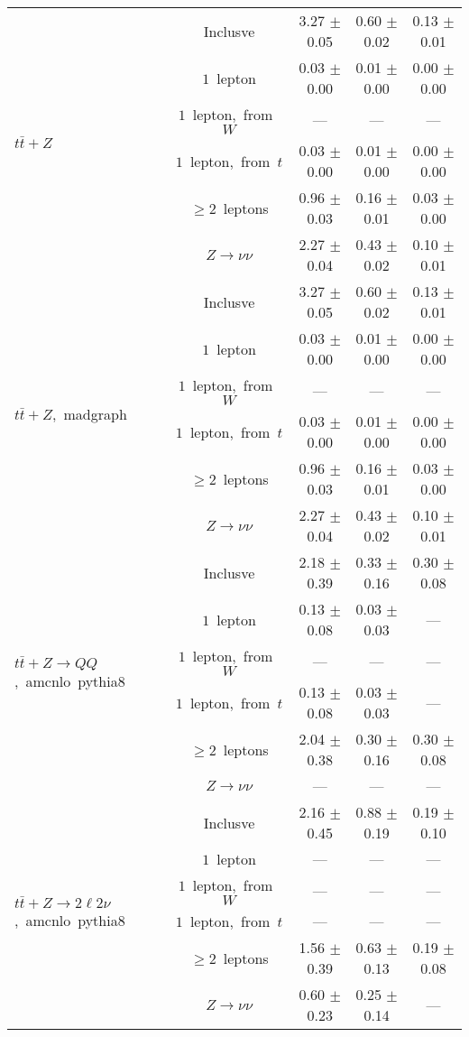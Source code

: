 \documentclass{article}
\begin{document}
\begin{longtable}{|l|c|c|c|c|}
\hline 
\multirow{6}{*}{$t\bar{t}+Z$} & Inclusve  & 3.27 $\pm$ 0.05  & 0.60 $\pm$ 0.02  & 0.13 $\pm$ 0.01 \\* 
 & $1$~lepton  & 0.03 $\pm$ 0.00  & 0.01 $\pm$ 0.00  & 0.00 $\pm$ 0.00 \\* 
 & $1$~lepton,~from~$W$  & ---  & ---  & --- \\* 
 & $1$~lepton,~from~$t$  & 0.03 $\pm$ 0.00  & 0.01 $\pm$ 0.00  & 0.00 $\pm$ 0.00 \\* 
 & $\ge2$~leptons  & 0.96 $\pm$ 0.03  & 0.16 $\pm$ 0.01  & 0.03 $\pm$ 0.00 \\* 
 & $Z\rightarrow\nu\nu$  & 2.27 $\pm$ 0.04  & 0.43 $\pm$ 0.02  & 0.10 $\pm$ 0.01 \\* 
\hline 
\multirow{6}{*}{$t\bar{t}+Z$,~madgraph} & Inclusve  & 3.27 $\pm$ 0.05  & 0.60 $\pm$ 0.02  & 0.13 $\pm$ 0.01 \\* 
 & $1$~lepton  & 0.03 $\pm$ 0.00  & 0.01 $\pm$ 0.00  & 0.00 $\pm$ 0.00 \\* 
 & $1$~lepton,~from~$W$  & ---  & ---  & --- \\* 
 & $1$~lepton,~from~$t$  & 0.03 $\pm$ 0.00  & 0.01 $\pm$ 0.00  & 0.00 $\pm$ 0.00 \\* 
 & $\ge2$~leptons  & 0.96 $\pm$ 0.03  & 0.16 $\pm$ 0.01  & 0.03 $\pm$ 0.00 \\* 
 & $Z\rightarrow\nu\nu$  & 2.27 $\pm$ 0.04  & 0.43 $\pm$ 0.02  & 0.10 $\pm$ 0.01 \\* 
\hline 
\multirow{6}{*}{$t\bar{t}+Z{\rightarrow}QQ$,~amcnlo~pythia8} & Inclusve  & 2.18 $\pm$ 0.39  & 0.33 $\pm$ 0.16  & 0.30 $\pm$ 0.08 \\* 
 & $1$~lepton  & 0.13 $\pm$ 0.08  & 0.03 $\pm$ 0.03  & --- \\* 
 & $1$~lepton,~from~$W$  & ---  & ---  & --- \\* 
 & $1$~lepton,~from~$t$  & 0.13 $\pm$ 0.08  & 0.03 $\pm$ 0.03  & --- \\* 
 & $\ge2$~leptons  & 2.04 $\pm$ 0.38  & 0.30 $\pm$ 0.16  & 0.30 $\pm$ 0.08 \\* 
 & $Z\rightarrow\nu\nu$  & ---  & ---  & --- \\* 
\hline 
\multirow{6}{*}{$t\bar{t}+Z{\rightarrow}2{\ell}2{\nu}$,~amcnlo~pythia8} & Inclusve  & 2.16 $\pm$ 0.45  & 0.88 $\pm$ 0.19  & 0.19 $\pm$ 0.10 \\* 
 & $1$~lepton  & ---  & ---  & --- \\* 
 & $1$~lepton,~from~$W$  & ---  & ---  & --- \\* 
 & $1$~lepton,~from~$t$  & ---  & ---  & --- \\* 
 & $\ge2$~leptons  & 1.56 $\pm$ 0.39  & 0.63 $\pm$ 0.13  & 0.19 $\pm$ 0.08 \\* 
 & $Z\rightarrow\nu\nu$  & 0.60 $\pm$ 0.23  & 0.25 $\pm$ 0.14  & --- \\* 
\hline 
\end{longtable} 
\end{document}
